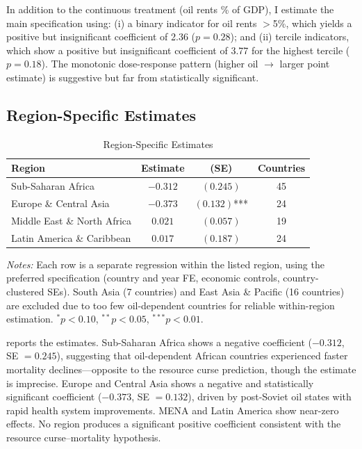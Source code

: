 \documentclass[12pt]{article}
\begin{document}
In addition to the continuous treatment (oil rents \% of GDP), I estimate the main specification using: (i) a binary indicator for oil rents $>$5\%, which yields a positive but insignificant coefficient of 2.36 ($p = 0.28$); and (ii) tercile indicators, which show a positive but insignificant coefficient of 3.77 for the highest tercile ($p = 0.18$). The monotonic dose-response pattern (higher oil $\rightarrow$ larger point estimate) is suggestive but far from statistically significant.

\subsection{Region-Specific Estimates}

\begin{table}[H]
\centering
\caption{Region-Specific Estimates}
\label{tab:region}
\begin{threeparttable}
\begin{tabular}{lccc}
\toprule
Region & Estimate & (SE) & Countries \\
\midrule
Sub-Saharan Africa & $-0.312$ & $(0.245)$ & 45 \\
Europe \& Central Asia & $-0.373$ & $(0.132)$*** & 24 \\
Middle East \& North Africa & $0.021$ & $(0.057)$ & 19 \\
Latin America \& Caribbean & $0.017$ & $(0.187)$ & 24 \\
\bottomrule
\end{tabular}
\begin{tablenotes}\small
\item \textit{Notes:} Each row is a separate regression within the listed region, using the preferred specification (country and year FE, economic controls, country-clustered SEs). South Asia (7 countries) and East Asia \& Pacific (16 countries) are excluded due to too few oil-dependent countries for reliable within-region estimation. $^{*}p<0.10$, $^{**}p<0.05$, $^{***}p<0.01$.
\end{tablenotes}
\end{threeparttable}
\end{table}

 reports the estimates. Sub-Saharan Africa shows a negative coefficient ($-0.312$, SE $= 0.245$), suggesting that oil-dependent African countries experienced faster mortality declines---opposite to the resource curse prediction, though the estimate is imprecise. Europe and Central Asia shows a negative and statistically significant coefficient ($-0.373$, SE $= 0.132$), driven by post-Soviet oil states with rapid health system improvements. MENA and Latin America show near-zero effects. No region produces a significant positive coefficient consistent with the resource curse--mortality hypothesis.
\end{document}
